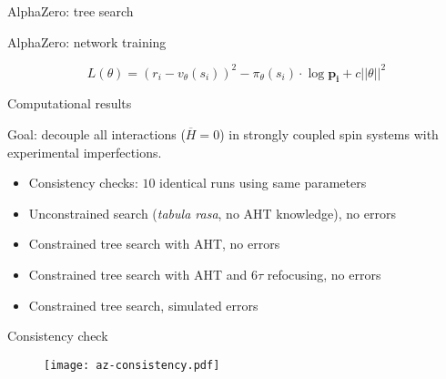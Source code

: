 \documentclass{beamer}
\begin{document}
\begin{frame}{AlphaZero: tree search}
%
\begin{figure}
\centering
\scalebox{.7}{

}
\end{figure}


\end{frame}


\begin{frame}{AlphaZero: network training}


\[
    L(\theta) = (r_i - v_\theta(s_i))^2 - \pi_\theta(s_i) \cdot \log \mathbf{p_i} + c ||\theta||^2
\]

\end{frame}



\begin{frame}{Computational results}


Goal: decouple all interactions (\(\overline{H}=0\)) in strongly coupled spin systems with experimental imperfections.

\begin{itemize}
    \item Consistency checks: $10$ identical runs using same parameters
    \item Unconstrained search (\emph{tabula rasa}, no AHT knowledge), no errors
    \item Constrained tree search with AHT, no errors
    \item Constrained tree search with AHT and $6\tau$ refocusing, no errors
    \item Constrained tree search, simulated errors
\end{itemize}

\note{

}

\end{frame}



\begin{frame}{Consistency check}

\begin{figure}
\centering
\texttt{[image: az-consistency.pdf]}
\end{figure}


\end{frame}
\end{document}
